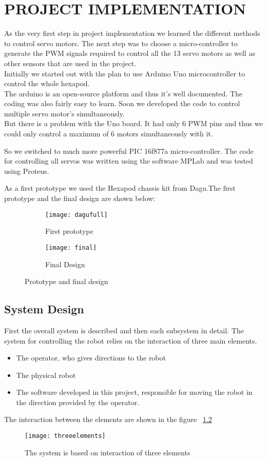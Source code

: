 \documentclass{report}
\begin{document}
\chapter{PROJECT IMPLEMENTATION}
As the very first step in project implementation we learned the different methods to control servo motors. The next step was to choose a micro-controller to generate the PWM signals required to control all the 13 servo motors as well as other sensors that are used in the project.\\
Initially we started out with the plan to use Arduino Uno microcontroller to control the whole hexapod.\\
The arduino is an open-source platform and thus it's well documented. The coding was also fairly easy to learn. Soon we developed the code to control multiple servo motor's simultaneously.\\
But there is a problem with the Uno board. It had only 6 PWM pins and thus we could only control a maximum of 6 motors simultaneously with it.

So we switched to much more powerful PIC 16f877a micro-controller. The code for controlling all servos was written using the software MPLab and was tested using Proteus. 

As a first prototype we used the Hexapod chassis kit from Dagu.The first prototype and the final design are shown below:
\begin{figure}[h!]

\begin{subfigure}{0.5\textwidth}
\centering
\texttt{[image: dagufull]}
\caption{First prototype}
\end{subfigure}%
\begin{subfigure}{0.5\textwidth}
\centering
\texttt{[image: final]}
\caption{Final Design}
\end{subfigure}%
\caption{Prototype and final design}
\label{fig215}
\end{figure}
\FloatBarrier
\section{System Design}
 First the overall system is described and then each
subsystem in detail. The system for controlling the robot relies on the interaction of three main elements.
\begin{itemize}
\item The operator, who gives directions to the robot
\item The physical robot
\item The software developed in this project, responsible for moving the robot in the direction provided by the operator.
\end{itemize}
The interaction between the elements are shown in the figure ~\ref{fig32}
\begin{figure}[h!]
\centering
\texttt{[image: threeelements]}
\caption{The system is based on interaction of three elements}
\label{fig32}
\end{figure}
\end{document}
